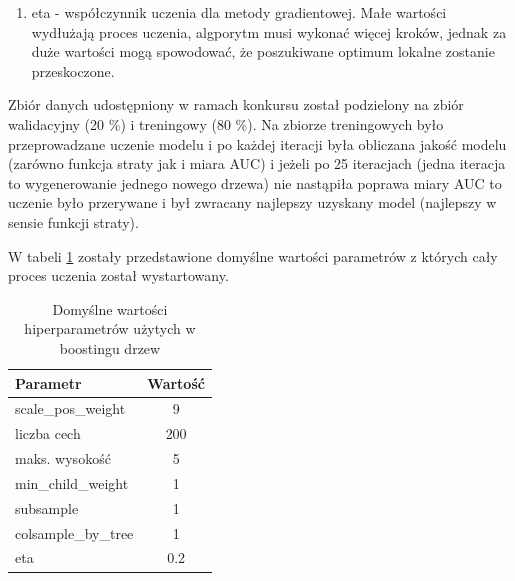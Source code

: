 \documentclass[12pt]{article}
\begin{document}
\begin{enumerate}
    \item eta - współczynnik uczenia dla metody gradientowej. Małe wartości wydłużają proces uczenia, algporytm musi wykonać więcej kroków, jednak za duże wartości mogą spowodować, że poszukiwane optimum lokalne zostanie przeskoczone.
    

\end{enumerate}

Zbiór danych udostępniony w ramach konkursu został podzielony na zbiór walidacyjny (20 \%) i treningowy (80 \%). Na zbiorze treningowych było przeprowadzane uczenie modelu i po każdej iteracji była obliczana jakość modelu (zarówno funkcja straty jak i miara AUC) i jeżeli po 25 iteracjach (jedna iteracja to wygenerowanie jednego nowego drzewa) nie nastąpiła poprawa miary AUC to uczenie było przerywane i był zwracany najlepszy uzyskany model (najlepszy w sensie funkcji straty). 

W tabeli \ref{tab:xgboost_default_params} zostały przedstawione domyślne wartości parametrów z których cały proces uczenia został wystartowany.

\begin{table}[h]
    \centering
    \begin{tabular}{l | c }
        Parametr & Wartość \\ \hline
        scale\_pos\_weight & 9 \\
        liczba cech & 200 \\
        maks. wysokość & 5 \\
        min\_child\_weight & 1 \\
        subsample & 1 \\
        colsample\_by\_tree & 1 \\
        eta & 0.2 \\
    \end{tabular}
    \caption{Domyślne wartości hiperparametrów użytych w boostingu drzew}
    \label{tab:xgboost_default_params}
\end{table}
\end{document}
